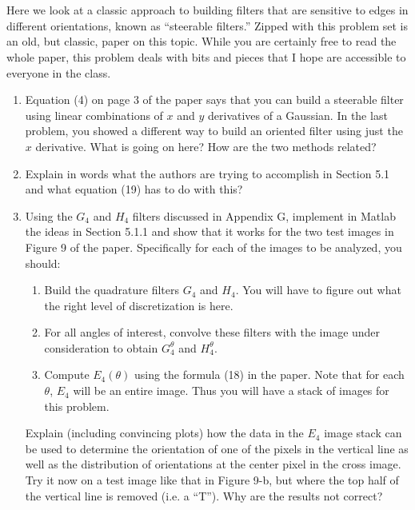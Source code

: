 \documentclass[11pt]{article}
\begin{document}
\section{}\label{ps04p05}
Here we look at a classic approach to building filters that are sensitive to edges in different orientations, known as ``steerable filters.'' Zipped with this problem set is an old, but classic, paper on this topic.  While you are certainly free to read the whole paper, this problem deals with bits and pieces that I hope are accessible to everyone in the class.
\begin{enumerate}
	\item Equation (4) on page 3 of the paper says that you can build a steerable filter using linear combinations of $x$ and $y$ derivatives of a Gaussian.  In the last problem, you showed a different way to build an oriented filter using just the $x$ derivative.  What is going on here?  How are the two methods related?
	
	\item Explain in words what the authors are trying to accomplish in Section 5.1 and what equation (19) has to do with this?
	
	\item Using the $G_4$ and $H_4$ filters discussed in Appendix G, implement in Matlab the ideas in Section 5.1.1 and show that it works for the two test images in Figure 9 of the paper.  Specifically for each of the images to be analyzed, you should:
	\begin{enumerate}
		\item Build the quadrature filters $G_4$ and $H_4$.  You will have to figure out what the right level of discretization is here.
		\item For all angles of interest, convolve these filters with the image under consideration to obtain $G_4^\theta$ and $H_4^\theta$.  
		\item Compute $E_4(\theta)$ using the formula (18) in the paper.  Note that for each $\theta$, $E_4$ will be an entire image.  Thus you will have a stack of images for this problem.  
	\end{enumerate}  
	Explain (including convincing plots) how the data in the $E_4$ image stack can be used to determine the orientation of one of the pixels in the vertical line as well as the distribution of orientations at the center pixel in the cross image.  	Try it now on a test image like that in Figure 9-b, but where the top half of the vertical line is removed (i.e. a ``T'').  Why are the results not correct?
\end{enumerate}
\end{document}
